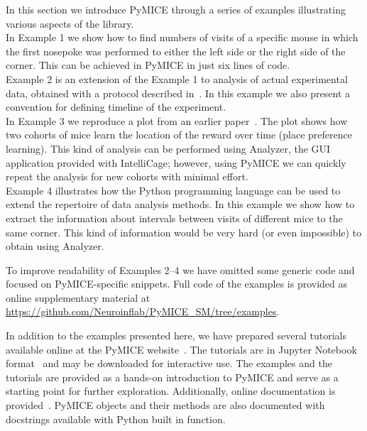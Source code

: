 In this section we introduce PyMICE through a series of examples illustrating various aspects of the library.\\
In Example 1 we show how to find numbers of visits of a specific mouse in which the first nosepoke was performed to either
the left side or the right side of the corner. 
This can be achieved in PyMICE in just six lines of code. \\
Example 2 is an extension of the Example 1 to analysis
of actual experimental data, obtained with a protocol described in~\cite{Knapska:2013dj}.
In this example we also present a convention for
defining timeline of the experiment. 
\\
In Example 3 we reproduce a plot from an earlier paper~\cite{Puscian:2014cu}.
The plot shows how two cohorts of mice learn the location
of the reward over time (place preference learning). This kind of analysis 
can be performed using Analyzer, the GUI application provided
with IntelliCage; however, using PyMICE we can quickly repeat the analysis for 
new cohorts with minimal effort. \\
Example 4 illustrates how the Python programming language can be used 
to extend the repertoire of data analysis methods.
In this example we show how to extract the information about intervals between visits of different mice to the same corner. 
This kind of information would be very hard (or even impossible) to obtain using Analyzer. 

To improve readability of Examples 2--4 we have omitted some generic code
and focused on PyMICE-specific snippets. Full code of the examples
is provided as online supplementary material at \url{https://github.com/Neuroinflab/PyMICE_SM/tree/examples}.



In addition to the examples presented here, we have prepared several 
tutorials available online at the PyMICE website~\cite{pymiceWebsite}.
The tutorials are in Jupyter Notebook format~\cite{jupyterOrg} and may be downloaded 
for interactive use. 
The examples and the tutorials are provided as a hands-on introduction to
PyMICE and serve as a starting point for further exploration.
Additionally, online documentation is provided~\cite{pymiceDoc}. PyMICE
objects and their methods are also documented with docstrings available with
Python built in  function.
 
